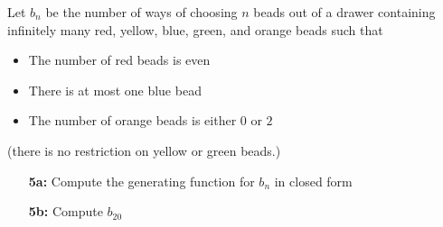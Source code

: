 \documentclass[12pt]{amsart}
\begin{document}
\begin{problem}

Let $b_n$ be the number of ways of choosing $n$ beads out of a drawer containing infinitely many red, yellow, blue, green, and orange beads such that
\begin{itemize}
	\item The number of red beads is even
	\item There is at most one blue bead
	\item The number of orange beads is either $0$ or $2$
\end{itemize}
(there is no restriction on yellow or green beads.)
\begin{itemize}
	\item[\textbf{5a:}] Compute the generating function for $b_n$ in closed form
	\item[\textbf{5b:}] Compute $b_{20}$
\end{itemize}
\end{problem}
\begin{solution}

\end{solution}
\end{document}

